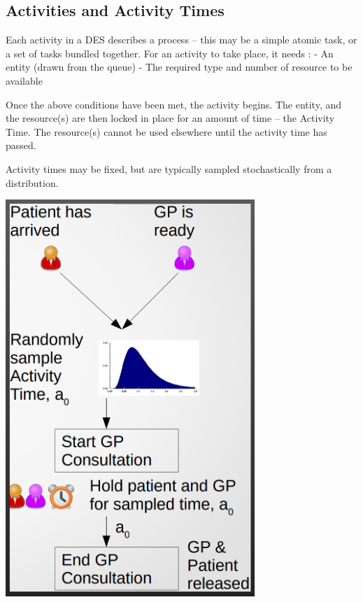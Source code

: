 \documentclass[
  letterpaper,
  DIV=11,
  numbers=noendperiod]{scrreprt}
\begin{document}
\subsection{Activities and Activity
Times}\label{activities-and-activity-times}

Each activity in a DES describes a process -- this may be a simple
atomic task, or a set of tasks bundled together. For an activity to take
place, it needs : - An entity (drawn from the queue) - The required type
and number of resource to be available

Once the above conditions have been met, the activity begins. The
entity, and the resource(s) are then locked in place for an amount of
time -- the Activity Time. The resource(s) cannot be used elsewhere
until the activity time has passed.

Activity times may be fixed, but are typically sampled stochastically
from a distribution.

\includegraphics{images/activity_activity_times.png}
\end{document}
